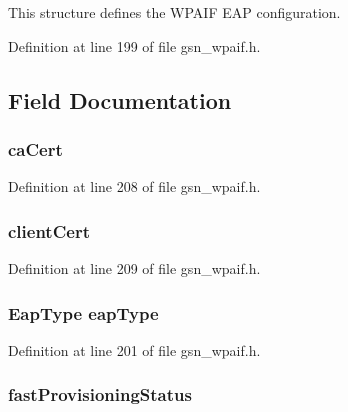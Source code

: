 This structure defines the WPAIF EAP configuration. 

Definition at line 199 of file gsn\_\-wpaif.h.



\subsection{Field Documentation}
\hypertarget{a00423_a85a21c86b1a4e31e3d2ce52be6274ec6}{
\subsubsection[{caCert}]{ {\bf caCert}}}
\label{a00423_a85a21c86b1a4e31e3d2ce52be6274ec6}


Definition at line 208 of file gsn\_\-wpaif.h.

\hypertarget{a00423_a063199a2ac038722dd24e9328de2cafa}{
\subsubsection[{clientCert}]{ {\bf clientCert}}}
\label{a00423_a063199a2ac038722dd24e9328de2cafa}


Definition at line 209 of file gsn\_\-wpaif.h.

\hypertarget{a00423_aa0bbdc8165b6fcc84e7529322a4041e8}{
\subsubsection[{eapType}]{\setlength{\rightskip}{0pt plus 5cm}EapType {\bf eapType}}}
\label{a00423_aa0bbdc8165b6fcc84e7529322a4041e8}


Definition at line 201 of file gsn\_\-wpaif.h.

\hypertarget{a00423_a4dc9193a014ae4c6113a2e44bc50c9a6}{
\subsubsection[{fastProvisioningStatus}]{ {\bf fastProvisioningStatus}}}
\label{a00423_a4dc9193a014ae4c6113a2e44bc50c9a6}


